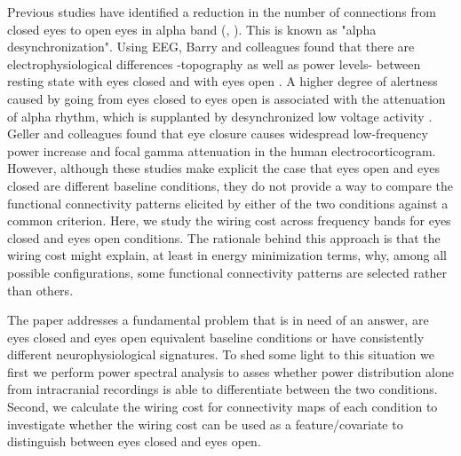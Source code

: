 \documentclass[11pt, onecolumn]{article}
\begin{document}
Previous studies have identified a reduction in the number of connections from closed eyes to open eyes in alpha band (\citep{tan2013difference}, \citep{barry2007eeg}). This is known as  "alpha desynchronization". Using EEG, Barry and colleagues found that there are electrophysiological differences -topography as well as power levels- between resting state with eyes closed and with eyes open \citep{barry2007eeg}.  
A higher degree of alertness caused by going from eyes closed to eyes open is associated with the attenuation of alpha rhythm, which is supplanted by desynchronized low voltage activity \citep{niedermeyer2005electroencephalography}.
Geller and colleagues \citep{geller2014eye} found that eye closure causes widespread low-frequency power increase and focal gamma attenuation in the human electrocorticogram. 
However, although these studies make explicit the case that eyes open and eyes closed are different baseline conditions, they do not provide a way to compare the functional connectivity patterns elicited by either of the two conditions against a common criterion.
Here, we study the wiring cost across frequency bands for eyes closed and eyes open conditions. The rationale behind this approach is that the wiring cost might explain, at least in energy minimization terms, why, among all possible configurations, some functional connectivity patterns are selected rather than others. 

The paper addresses a fundamental problem that is in need of an answer, are eyes closed and eyes open equivalent baseline conditions or have consistently different neurophysiological signatures. To shed some light to this situation we first  we perform power spectral analysis to asses whether power distribution alone from intracranial recordings is able to differentiate between the two conditions. Second, we calculate the wiring cost for connectivity maps of each condition to investigate whether the wiring cost can be used as a feature/covariate to distinguish between eyes closed and eyes open. 
\end{document}
